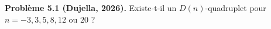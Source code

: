 \textbf{Problème 5.1 (Dujella, 2026).} Existe-t-il un $D(n)$-quadruplet pour $n = -3, 3, 5, 8, 12$ ou $20$ ?
